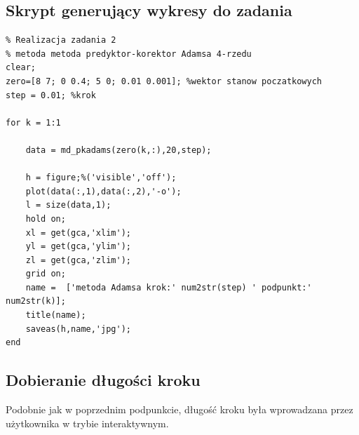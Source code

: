 \documentclass[a4paper, 11pt]{article}
\begin{document}
\subsection{Skrypt generujący wykresy do zadania}
\begin{lstlisting}
% Realizacja zadania 2 
% metoda metoda predyktor-korektor Adamsa 4-rzedu
clear; 
zero=[8 7; 0 0.4; 5 0; 0.01 0.001]; %wektor stanow poczatkowych
step = 0.01; %krok

for k = 1:1
    
    data = md_pkadams(zero(k,:),20,step);
   
    h = figure;%('visible','off');
    plot(data(:,1),data(:,2),'-o');
    l = size(data,1);
    hold on;
    xl = get(gca,'xlim');
    yl = get(gca,'ylim');
    zl = get(gca,'zlim');
    grid on; 
    name =  ['metoda Adamsa krok:' num2str(step) ' podpunkt:' num2str(k)];
    title(name);
    saveas(h,name,'jpg'); 
end
\end{lstlisting}

\subsection{Dobieranie długości kroku}
Podobnie jak w poprzednim podpunkcie, długość kroku była wprowadzana przez użytkownika w trybie interaktywnym. 
\end{document}
